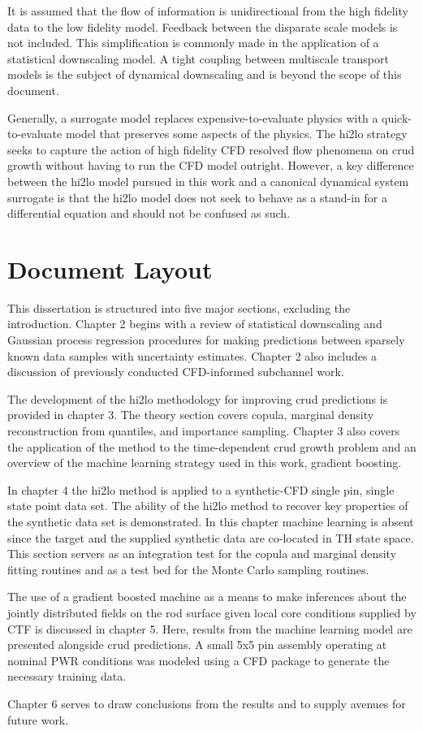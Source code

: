 It is assumed that the flow of information is unidirectional from the high fidelity data to the low fidelity model.  Feedback between the disparate scale models is not included.  This simplification is commonly made in the application of a statistical downscaling model.  A tight coupling between multiscale transport models is the subject of dynamical downscaling and is beyond the scope of this document.

Generally, a surrogate model replaces expensive-to-evaluate physics with a quick-to-evaluate model that preserves some aspects of the physics. The hi2lo strategy seeks to capture the action of high fidelity CFD resolved flow phenomena on crud growth without having to run the CFD model outright.  However, a key difference between the hi2lo model pursued in this work and a canonical dynamical system surrogate is that the hi2lo model does not seek to behave as a stand-in for a differential equation and should not be confused as such.  


\section{Document Layout}

This dissertation is structured into five major sections, excluding the introduction.  Chapter 2 begins with a review of statistical downscaling and Gaussian process regression procedures for making predictions between sparsely known data samples with uncertainty estimates.  Chapter 2 also includes a discussion of previously conducted CFD-informed subchannel work. 

The development of the hi2lo methodology for improving crud predictions is provided in chapter 3.  The theory section covers copula, marginal density reconstruction from quantiles, and importance sampling.  Chapter 3 also covers the application of the method to the time-dependent crud growth problem and an overview of the machine learning strategy used in this work, gradient boosting.   

In chapter 4 the hi2lo method is applied to a synthetic-CFD single pin, single state point data set.  The ability of the hi2lo method to recover key properties of the synthetic data set is demonstrated.   In this chapter machine learning is absent since the target and the supplied synthetic data are co-located in TH state space.  This section servers as an integration test for the copula and marginal density fitting routines and as a test bed for the Monte Carlo sampling routines.

The use of a gradient boosted machine as a means to make inferences about the jointly distributed fields on the rod surface given local core conditions supplied by CTF is discussed in chapter 5.  Here, results from the machine learning model are presented alongside crud predictions.  A small 5x5 pin assembly operating at nominal PWR conditions was modeled using a CFD package to generate the necessary training data.

Chapter 6 serves to draw conclusions from the results and to supply avenues for future work.   


